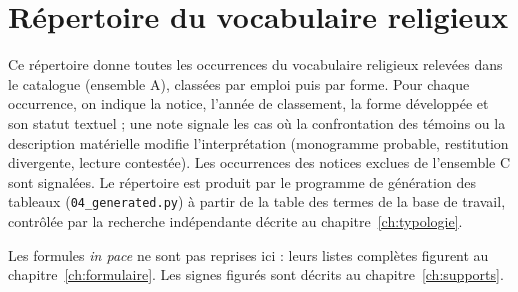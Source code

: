 \chapter{Répertoire du vocabulaire religieux}\label{ch:rep_religieux}

Ce répertoire donne toutes les occurrences du vocabulaire religieux relevées dans le catalogue (ensemble A), classées par emploi puis par forme. Pour chaque occurrence, on indique la notice, l’année de classement, la forme développée et son statut textuel ; une note signale les cas où la confrontation des témoins ou la description matérielle modifie l’interprétation (monogramme probable, restitution divergente, lecture contestée). Les occurrences des notices exclues de l’ensemble C sont signalées. Le répertoire est produit par le programme de génération des tableaux (\texttt{04\_generated.py}) à partir de la table des termes de la base de travail, contrôlée par la recherche indépendante décrite au chapitre~\ref{ch:typologie}.

Les formules \emph{in pace} ne sont pas reprises ici : leurs listes complètes figurent au chapitre~\ref{ch:formulaire}. Les signes figurés sont décrits au chapitre~\ref{ch:supports}.

{\small

}
